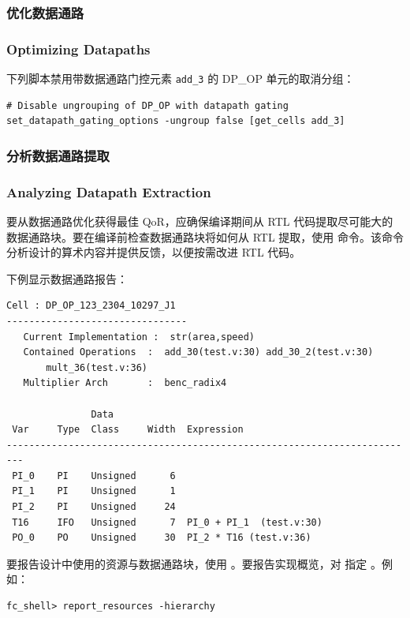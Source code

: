 \subsubsection{优化数据通路}
\subsubsection*{Optimizing Datapaths}

下列脚本禁用带数据通路门控元素 \texttt{add\_3} 的 DP\_OP 单元的取消分组：
\begin{lstlisting}
# Disable ungrouping of DP_OP with datapath gating
set_datapath_gating_options -ungroup false [get_cells add_3]
\end{lstlisting}

\subsubsection{分析数据通路提取}
\subsubsection*{Analyzing Datapath Extraction}

要从数据通路优化获得最佳 QoR，应确保编译期间从 RTL 代码提取尽可能大的数据通路块。要在编译前检查数据通路块将如何从 RTL 提取，使用  命令。该命令分析设计的算术内容并提供反馈，以便按需改进 RTL 代码。

下例显示数据通路报告：
\begin{lstlisting}
Cell : DP_OP_123_2304_10297_J1
--------------------------------
   Current Implementation :  str(area,speed)
   Contained Operations  :  add_30(test.v:30) add_30_2(test.v:30)
       mult_36(test.v:36)
   Multiplier Arch       :  benc_radix4

               Data
 Var     Type  Class     Width  Expression
-------------------------------------------------------------------------
 PI_0    PI    Unsigned      6
 PI_1    PI    Unsigned      1
 PI_2    PI    Unsigned     24
 T16     IFO   Unsigned      7  PI_0 + PI_1  (test.v:30)
 PO_0    PO    Unsigned     30  PI_2 * T16 (test.v:36)
\end{lstlisting}

要报告设计中使用的资源与数据通路块，使用 。要报告实现概览，对  指定 。例如：
\begin{lstlisting}
fc_shell> report_resources -hierarchy
\end{lstlisting}

